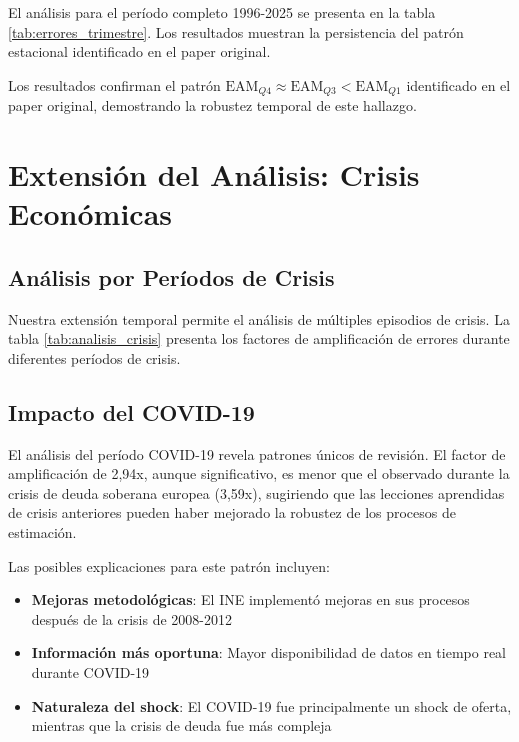 \documentclass{article}
\begin{document}
El análisis para el período completo 1996-2025 se presenta en la tabla \ref{tab:errores_trimestre}. Los resultados muestran la persistencia del patrón estacional identificado en el paper original.



Los resultados confirman el patrón $\text{EAM}_{Q4} \approx \text{EAM}_{Q3} < \text{EAM}_{Q1}$ identificado en el paper original, demostrando la robustez temporal de este hallazgo.

\section{Extensión del Análisis: Crisis Económicas}

\subsection{Análisis por Períodos de Crisis}

Nuestra extensión temporal permite el análisis de múltiples episodios de crisis. La tabla \ref{tab:analisis_crisis} presenta los factores de amplificación de errores durante diferentes períodos de crisis.



\subsection{Impacto del COVID-19}

El análisis del período COVID-19 revela patrones únicos de revisión. El factor de amplificación de 2,94x, aunque significativo, es menor que el observado durante la crisis de deuda soberana europea (3,59x), sugiriendo que las lecciones aprendidas de crisis anteriores pueden haber mejorado la robustez de los procesos de estimación.

Las posibles explicaciones para este patrón incluyen:

\begin{itemize}
\item \textbf{Mejoras metodológicas}: El INE implementó mejoras en sus procesos después de la crisis de 2008-2012
\item \textbf{Información más oportuna}: Mayor disponibilidad de datos en tiempo real durante COVID-19
\item \textbf{Naturaleza del shock}: El COVID-19 fue principalmente un shock de oferta, mientras que la crisis de deuda fue más compleja
\end{itemize}
\end{document}
